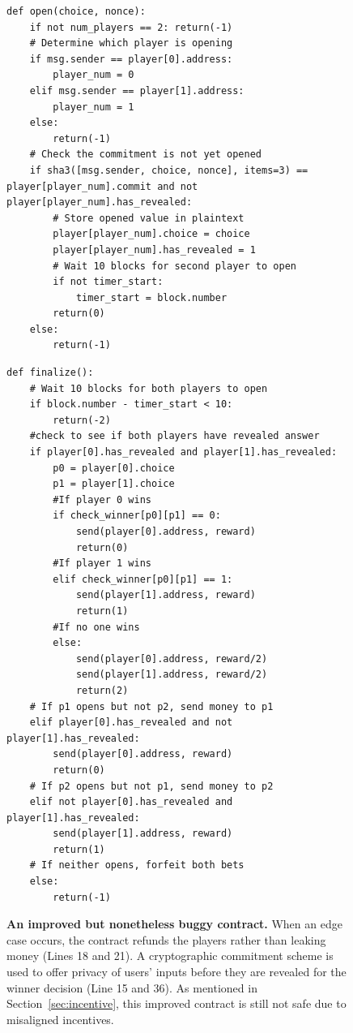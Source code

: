 \documentclass{llncs}
\begin{document}
\begin{figure}
\begin{minipage}{\columnwidth}
\begin{mdframed}
\begin{verbatim}
def open(choice, nonce):
	if not num_players == 2: return(-1)
	# Determine which player is opening
	if msg.sender == player[0].address:
		player_num = 0
	elif msg.sender == player[1].address:
		player_num = 1
	else:
		return(-1)
	# Check the commitment is not yet opened
	if sha3([msg.sender, choice, nonce], items=3) == player[player_num].commit and not player[player_num].has_revealed:
		# Store opened value in plaintext
		player[player_num].choice = choice
		player[player_num].has_revealed = 1		
		# Wait 10 blocks for second player to open
		if not timer_start:
			timer_start = block.number
		return(0)
	else:
		return(-1)
\end{verbatim}
\end{mdframed}
\end{minipage}
%
%
\begin{minipage}{\columnwidth}%
\begin{mdframed}
\begin{verbatim}
def finalize():
	# Wait 10 blocks for both players to open
	if block.number - timer_start < 10: 
		return(-2)
	#check to see if both players have revealed answer
	if player[0].has_revealed and player[1].has_revealed:
		p0 = player[0].choice
		p1 = player[1].choice
		#If player 0 wins
		if check_winner[p0][p1] == 0:
			send(player[0].address, reward)
			return(0)
		#If player 1 wins
		elif check_winner[p0][p1] == 1:
			send(player[1].address, reward)
			return(1)
		#If no one wins
		else:
			send(player[0].address, reward/2)
			send(player[1].address, reward/2)
			return(2)
	# If p1 opens but not p2, send money to p1
	elif player[0].has_revealed and not player[1].has_revealed:
		send(player[0].address, reward)
		return(0)
	# If p2 opens but not p1, send money to p2
	elif not player[0].has_revealed and player[1].has_revealed:
		send(player[1].address, reward)
		return(1)
	# If neither opens, forfeit both bets
	else:
		return(-1)
\end{verbatim}
\end{mdframed}
\end{minipage}%
%
\caption{
\label{fig:nocrypto}
{\bf An improved but nonetheless buggy contract.} 
When an edge case occurs, the contract refunds the players rather than leaking money (Lines 18 and 21). 
A cryptographic commitment scheme is used
to offer privacy of users' inputs before 
they are revealed for the winner decision (Line 15 and 36).
As mentioned in Section~\ref{sec:incentive}, 
this improved contract is still not safe  
due to misaligned incentives.
}
\end{figure}
\end{document}
